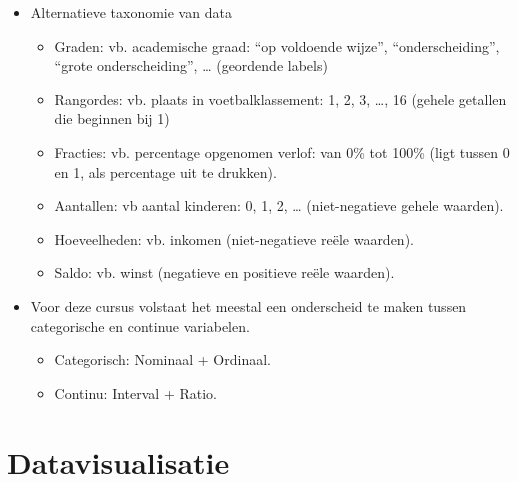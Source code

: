 \documentclass[]{memoir}
\providecommand{\tightlist}{%
  \setlength{\itemsep}{0pt}\setlength{\parskip}{0pt}}
\begin{document}
\begin{itemize}
\tightlist
\item
  Alternatieve taxonomie van data

  \begin{itemize}
  \tightlist
  \item
    Graden: vb. academische graad: ``op voldoende wijze'', ``onderscheiding'', ``grote onderscheiding'', \ldots{} (geordende labels)
  \item
    Rangordes: vb. plaats in voetbalklassement: 1, 2, 3, \ldots{}, 16 (gehele getallen die beginnen bij 1)
  \item
    Fracties: vb. percentage opgenomen verlof: van 0\% tot 100\% (ligt tussen 0 en 1, als percentage uit te drukken).
  \item
    Aantallen: vb aantal kinderen: 0, 1, 2, \ldots{} (niet-negatieve gehele waarden).
  \item
    Hoeveelheden: vb. inkomen (niet-negatieve reële waarden).
  \item
    Saldo: vb. winst (negatieve en positieve reële waarden).
  \end{itemize}
\item
  Voor deze cursus volstaat het meestal een onderscheid te maken tussen categorische en continue variabelen.

  \begin{itemize}
  \tightlist
  \item
    Categorisch: Nominaal + Ordinaal.
  \item
    Continu: Interval + Ratio.
  \end{itemize}
\end{itemize}

\hypertarget{datavisualisatie}{%
\section{Datavisualisatie}\label{datavisualisatie}}
\end{document}

